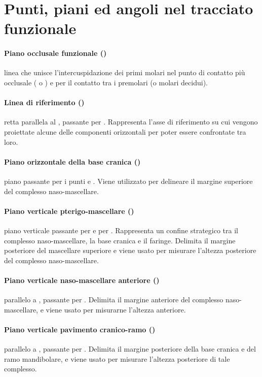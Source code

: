 \section{Punti, piani ed angoli nel tracciato funzionale}
\paragraph{Piano occlusale funzionale ()} linea che unisce l'intercuspidazione dei primi molari nel punto di contatto più occlusale ( o ) e per il contatto tra i premolari (o molari decidui).
\paragraph{Linea di riferimento ()} retta parallela al , passante per . Rappresenta l'asse di riferimento su cui vengono proiettate alcune delle componenti orizzontali per poter essere confrontate tra loro.
\paragraph{Piano orizzontale della base cranica ()} piano passante per i punti  e . Viene utilizzato per delineare il margine superiore del complesso naso-mascellare.
\paragraph{Piano verticale pterigo-mascellare ()} piano verticale passante per  e per . Rappresenta un confine strategico tra il complesso naso-mascellare, la base cranica e il faringe. Delimita il margine posteriore del mascellare superiore e viene usato per misurare l'altezza posteriore del complesso naso-mascellare.
\paragraph{Piano verticale naso-mascellare anteriore ()} parallelo a , passante per . Delimita il margine anteriore del complesso naso-mascellare, e viene usato per misurarne l'altezza anteriore.
\paragraph{Piano verticale pavimento cranico-ramo ()} parallelo a , passante per . Delimita il margine posteriore della base cranica e del ramo mandibolare, e viene usato per misurare l'altezza posteriore di tale complesso.
